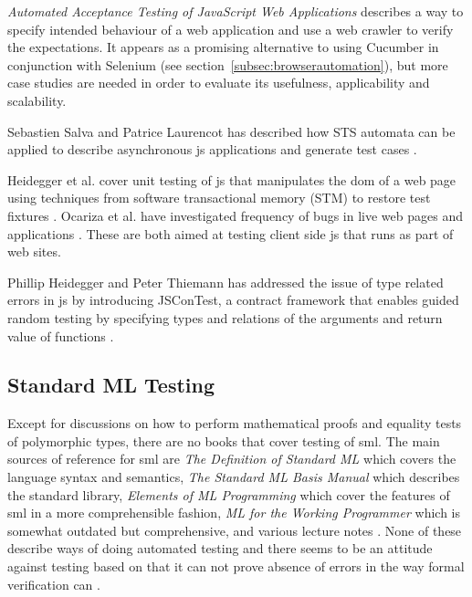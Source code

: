 \documentclass[11pt]{article}
\begin{document}
\emph{Automated Acceptance Testing of JavaScript Web Applications} \cite{AutomatedAcceptance} describes a way to specify intended behaviour of a web application and use a web crawler to verify the expectations. It appears as a promising alternative to using Cucumber in conjunction with Selenium (see section~\ref{subsec:browserautomation}), but more case studies are needed in order to evaluate its usefulness, applicability and scalability. %

Sebastien Salva and Patrice Laurencot has described how STS automata can be applied to describe asynchronous \gls{js} applications and generate test cases \cite{AutomatedAjax}.

Heidegger et al. cover unit testing of \gls{js} that manipulates the \gls{dom} of a web page using techniques from software transactional memory (STM) to restore test fixtures \cite{DOMJavascript}. Ocariza et al. have investigated frequency of bugs in live web pages and applications \cite{Wild}. These are both aimed at testing client side \gls{js} that runs as part of web sites.

Phillip Heidegger and Peter Thiemann has addressed the issue of type related errors in \gls{js} by introducing JSConTest, a contract framework that enables guided random testing by specifying types and relations of the arguments and return value of functions \cite{ContractTesting}.

\subsection{Standard ML Testing}
\label{subsec:previousworksml}

Except for discussions on how to perform mathematical proofs and equality tests of polymorphic types, there are no books that cover testing of \gls{sml}. The main sources of reference for \gls{sml} are \emph{The Definition of Standard ML} \cite{DefinitionStandardML} which covers the language syntax and semantics, \emph{The Standard ML Basis Manual} \cite{BasisManual} which describes the standard library, \emph{Elements of ML Programming} \cite{ElementsML} which cover the features of \gls{sml} in a more comprehensible fashion, \emph{ML for the Working Programmer} \cite{WorkingProgrammer} which is somewhat outdated but comprehensive, and various lecture notes \cite{ProgSml97}\cite{ProgSmlHarper}\cite{FunctionalML}\cite{NotesSMLNJ}. None of these describe ways of doing automated testing and there seems to be an attitude against testing based on that it can not prove absence of errors in the way formal verification can \cite[p.~16]{ProgSmlHarper}.
\end{document}
